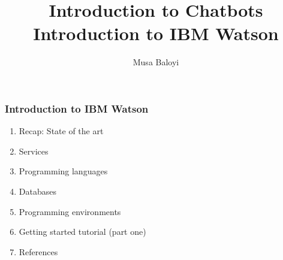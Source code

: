 \documentclass[11pt]{beamer}
\begin{document}
	\author{Musa Baloyi}
	\title{Introduction to Chatbots \\ Introduction to IBM Watson} %
	\begin{frame}[plain]
	\maketitle
\end{frame}

\begin{frame}
	\frametitle{Introduction to IBM Watson}
	\begin{enumerate}
		\item Recap: State of the art
		\item Services
		\item Programming languages
		\item Databases
		\item Programming environments
		\item Getting started tutorial (part one)
		\item References
	\end{enumerate}
\end{frame}

\end{document}
